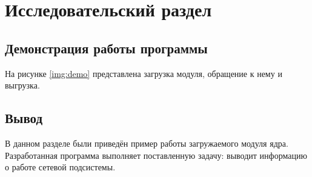 \chapter{Исследовательский раздел}

\section{Демонстрация работы программы}

На рисунке \ref{img:demo} представлена загрузка модуля, обращение к нему и выгрузка.

\FloatBarrier

\section{Вывод}

В данном разделе были приведён пример работы загружаемого модуля ядра. Разработанная программа выполняет поставленную задачу: выводит информацию о работе сетевой подсистемы.